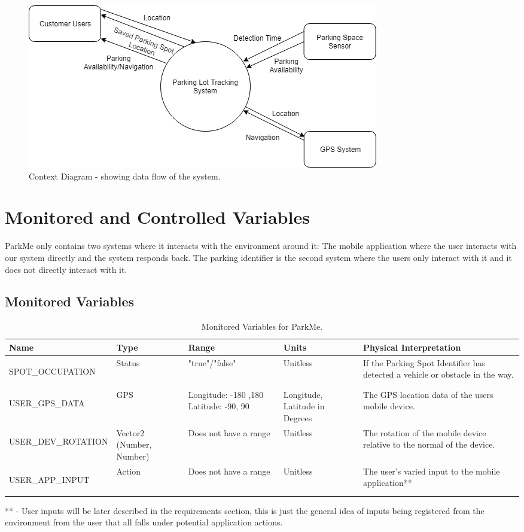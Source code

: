 \documentclass[]{article}
\begin{document}
\graphicspath{ {./images/} }
    \begin{figure}[H]
        \centering
        \includegraphics{context-diagram}
        \caption{Context Diagram - showing data flow of the system.}
        \label{fig:cd}
    \end{figure}

\section{Monitored and Controlled Variables}
ParkMe only contains two systems where it interacts with the environment around it: The mobile application where the user interacts with our system directly and the system responds back. The parking identifier is the second system where the users only interact with it and it does not directly interact with it.


\begin{table}
	\subsection{Monitored Variables}
	\begin{tabular}{ | m{4cm} | m{1.5cm}| m{2cm}| m{3cm}| m{3cm} |} 
		\hline
		Name & Type & Range & Units & Physical Interpretation \\ [0.5ex] 
		\hline
		\hypertarget{SPOCC}{SPOT\_OCCUPATION} & Status & "true"/"false" & Unitless & If the Parking Spot Identifier has detected a vehicle or obstacle in the way. \\ 
		\hline
		\hypertarget{UGPSDT}{USER\_GPS\_DATA} & GPS & Longitude: -180 ,180
		Latitude: -90, 90
	 & Longitude, Latitude in Degrees & The GPS location data of the users mobile device. \\ 
		\hline 
		\hypertarget{UDVCROT}{USER\_DEV\_ROTATION} & Vector2 (Number, Number) & Does not have a range & Unitless & The rotation of the mobile device relative to the normal of the device. \\
		\hline
		\hypertarget{UAIN}{USER\_APP\_INPUT} & Action & Does not have a range & Unitless & The user’s varied input to the mobile application** \\	
		\hline
	\end{tabular}
	\caption{Monitored Variables for ParkMe.}
** - User inputs will be later described in the requirements section, this is just the general idea of inputs being registered from the environment from the user that all falls under potential application actions.
\end{table}
\end{document}
